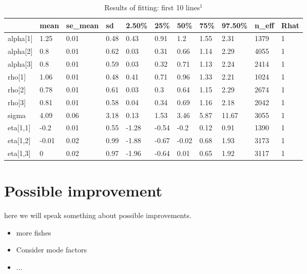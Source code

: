 \documentclass[a4paper]{artikel3}
\begin{document}
\begin{table}[!ht]
\centering
\caption{Results of fitting: first 10 lines$^1$}
\label{gp_results}
\begin{tabular}{lllllllllll}
\hline
             & mean  & se\_mean & sd   & 2.50\% & 25\%  & 50\%  & 75\% & 97.50\% & n\_eff & Rhat \\ \hline
alpha{[}1{]} & 1.25  & 0.01     & 0.48 & 0.43   & 0.91  & 1.2   & 1.55 & 2.31    & 1379   & 1    \\
alpha{[}2{]} & 0.8   & 0.01     & 0.62 & 0.03   & 0.31  & 0.66  & 1.14 & 2.29    & 4055   & 1    \\
alpha{[}3{]} & 0.8   & 0.01     & 0.59 & 0.03   & 0.32  & 0.71  & 1.13 & 2.24    & 2414   & 1    \\
rho{[}1{]}   & 1.06  & 0.01     & 0.48 & 0.41   & 0.71  & 0.96  & 1.33 & 2.21    & 1024   & 1    \\
rho{[}2{]}   & 0.78  & 0.01     & 0.61 & 0.03   & 0.3   & 0.64  & 1.15 & 2.29    & 2674   & 1    \\
rho{[}3{]}   & 0.81  & 0.01     & 0.58 & 0.04   & 0.34  & 0.69  & 1.16 & 2.18    & 2042   & 1    \\
sigma        & 4.09  & 0.06     & 3.18 & 0.13   & 1.53  & 3.46  & 5.87 & 11.67   & 3055   & 1    \\
eta{[}1,1{]} & -0.2  & 0.01     & 0.55 & -1.28  & -0.54 & -0.2  & 0.12 & 0.91    & 1390   & 1    \\
eta{[}1,2{]} & -0.01 & 0.02     & 0.99 & -1.88  & -0.67 & -0.02 & 0.68 & 1.93    & 3173   & 1    \\
eta{[}1,3{]} & 0     & 0.02     & 0.97 & -1.96  & -0.64 & 0.01  & 0.65 & 1.92    & 3117   & 1    \\ \hline
\end{tabular}
\end{table}


\section{Possible improvement}

here we will speak something about possible improvements. 

\begin{itemize}
\item more fishes 
\item Consider mode factors
\item ...
\end{itemize}
\end{document}
